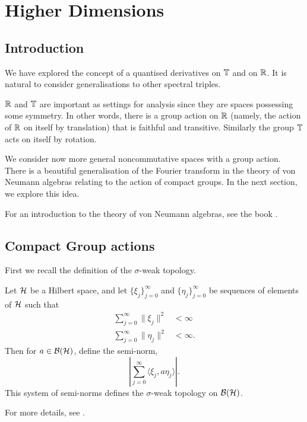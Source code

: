
\chapter{Higher Dimensions} %

\label{HigherDimensions} %


\section{Introduction}
We have explored the concept of a quantised derivatives on $\mathbb{T}$ and on $\mathbb{R}$.
It is natural to consider generalisations to other spectral triples. 

$\mathbb{R}$ and $\mathbb{T}$ are important as settings for analysis since they
are spaces possessing some symmetry. In other words, there is a group
action on $\mathbb{R}$ (namely, the action of $\mathbb{R}$ on itself by translation)
that is faithful and transitive. Similarly the group $\mathbb{T}$
acts on itself by rotation.

We consider now more general noncommutative spaces with a group
action. There is a beautiful generalisation of the Fourier
transform in the theory of von Neumann algebras relating
to the action of compact groups. In the next section, we explore this idea.

For an introduction to the theory of von Neumann algebras, see the book \cite{Sakai1971}.

\section{Compact Group actions}

First we recall the definition of the $\sigma$-weak topology.

\begin{definition}
    Let $\mathcal{H}$ be a Hilbert space, and let $\{\xi_j\}_{j = 0}^\infty$
    and $\{\eta_j\}_{j=0}^\infty$ be sequences of elements of $\mathcal{H}$
    such that 
    \begin{align}
        \sum_{j=0}^\infty \|\xi_j\|^2 &< \infty\\
        \sum_{j=0}^\infty \|\eta_j\|^2 &< \infty.
    \end{align}
    Then for $a \in \mathcal{B}(\mathcal{H})$, define the semi-norm,
    \begin{equation}
        \left| \sum_{j=0}^\infty \langle \xi_j,a\eta_j\rangle\right|.
    \end{equation}
    This system of semi-norms defines the $\sigma$-weak topology
    on $\mathcal{B}(\mathcal{H})$.
    
    For more details, see \cite{Sakai1971}.
\end{definition}

